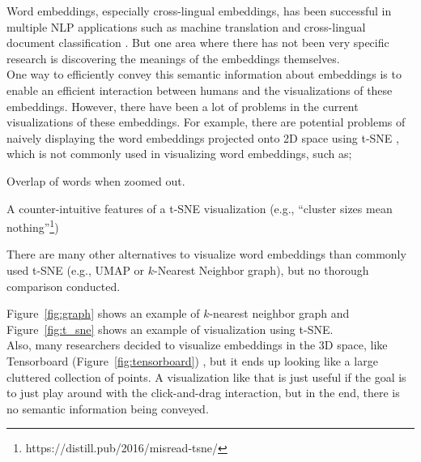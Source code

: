 Word embeddings, especially cross-lingual embeddings, has been successful in multiple NLP applications such as machine translation \cite{lample2018unsupervised, artetxe2018unsupervised} and cross-lingual document classification \cite{klementiev-titov-bhattarai:2012:PAPERS}. 
But one area where there has not been very specific research is discovering the meanings of the embeddings themselves. \\

One way to efficiently convey this semantic information about embeddings is to enable an efficient interaction between humans and the visualizations of these embeddings. However, there have been a lot of problems in the current visualizations of these embeddings.
For example, there are potential problems of naively displaying the word embeddings projected onto 2D space using t-SNE \cite{t-sne}, which is not commonly used in visualizing word embeddings, such as;
\begin{itemize*}
  \item Overlap of words when zoomed out. 
  \item A counter-intuitive features of a t-SNE visualization (e.g., ``cluster sizes mean nothing''\footnote{https://distill.pub/2016/misread-tsne/}) 
  \item There are many other alternatives to visualize word embeddings than commonly used t-SNE (e.g., UMAP \cite{umap} or $k$-Nearest Neighbor graph), but no thorough comparison conducted. 
\end{itemize*}
Figure~\ref{fig:graph} shows an example of $k$-nearest neighbor graph and Figure~\ref{fig:t_sne} shows an example of visualization using t-SNE. \\

Also, many researchers decided to visualize embeddings in the 3D space, like Tensorboard (Figure~\ref{fig:tensorboard}) \cite{tensorboard_viz}, but it ends up looking like a large cluttered collection of points. A visualization like that is just useful if the goal is to just play around with the click-and-drag interaction, but in the end, there is no semantic information being conveyed. \\


